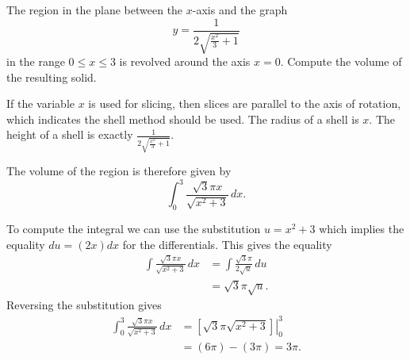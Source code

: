 \documentclass{ximera}
\begin{document}
\begin{question}%

The region in the plane between the  \(x\)-axis and the graph
\[ y = \frac{1}{2 \sqrt{\frac{x^{2}}{3} + 1}} \]
 in the range \(0 \leq x \leq 3\) is revolved around the axis \(x = 0\). Compute the volume of the resulting solid.
\begin{multiplechoice}
\choice{\(\displaystyle 2 \pi\)}
\choice[correct]{\(\displaystyle 3 \pi\)}
\choice{\(\displaystyle 5 \pi\)}
\end{multiplechoice}
\begin{feedback}
If the variable \(x\) is used for slicing, then slices are parallel to the axis of rotation, which indicates the shell method should be used.
The radius of a shell is \(x\). The height of a shell is exactly \(\frac{1}{2 \sqrt{\frac{x^{2}}{3} + 1}}\).
\begin{hint}
The volume of the region is therefore given by
\[ \int_{0}^{3} \frac{\sqrt{3} \pi x}{\sqrt{x^{2} + 3}}\, dx. \]
\begin{hint}
 To compute the integral we can use the substitution \(u = x^{2} + 3\) which implies the equality \(du = \left(2 x\right)dx\) for the differentials. This gives the equality
\[ \begin{aligned} \int \frac{\sqrt{3} \pi x}{\sqrt{x^{2} + 3}}\, dx & = \int \frac{\sqrt{3} \pi}{2 \sqrt{u}}\, du \\
 & = \sqrt{3} \pi \sqrt{u}. \end{aligned} \]
Reversing the substitution gives
\[ \begin{aligned} \int_{0}^{3} \frac{\sqrt{3} \pi x}{\sqrt{x^{2} + 3}}\, dx & = \left. \left[\sqrt{3} \pi \sqrt{x^{2} + 3} \right] \right|_{0}^{3}\\ & = \left(6 \pi \right) - \left(3 \pi \right) = 3 \pi. \end{aligned} \]
\end{hint}
\end{hint}
\end{feedback}

\end{question}
\end{document}
